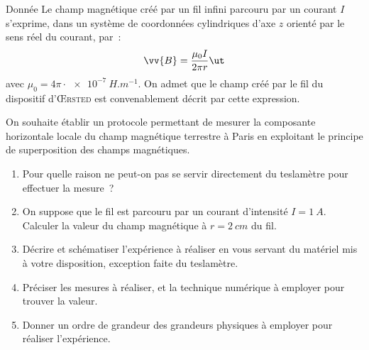 \documentclass[a4paper, 10pt, final, garamond]{book}
\begin{document}
\begin{tdefi}{Donnée}
  Le champ magnétique créé par un fil infini parcouru par un courant $I$
  s'exprime, dans un système de coordonnées cylindriques d'axe $z$ orienté par
  le sens réel du courant, par~:
  \[
    \vv{B} = \frac{\mu_0 I}{2\pi r}\ut
  \]
  avec $\mu_0 = 4\pi \cdot \SI{e-7}{H.m^{-1}}$. On admet que le champ créé par
  le fil du dispositif d'\textsc{Œrsted} est convenablement décrit par cette
  expression.
\end{tdefi}
On souhaite établir un protocole permettant de mesurer la composante horizontale
locale du champ magnétique terrestre à Paris en exploitant le principe de
superposition des champs magnétiques.
\begin{enumerate}
  \item Pour quelle raison ne peut-on pas se servir directement du teslamètre
    pour effectuer la mesure~?
  \item On suppose que le fil est parcouru par un courant d'intensité $I =
    \SI{1}{A}$. Calculer la valeur du champ magnétique à $r = \SI{2}{cm}$ du
    fil.
  \item Décrire et schématiser l'expérience à réaliser en vous servant du
    matériel mis à votre disposition, exception faite du teslamètre.
  \item Préciser les mesures à réaliser, et la technique numérique à employer
    pour trouver la valeur.
  \item Donner un ordre de grandeur des grandeurs physiques à employer pour
    réaliser l'expérience.
\end{enumerate}
\end{document}
